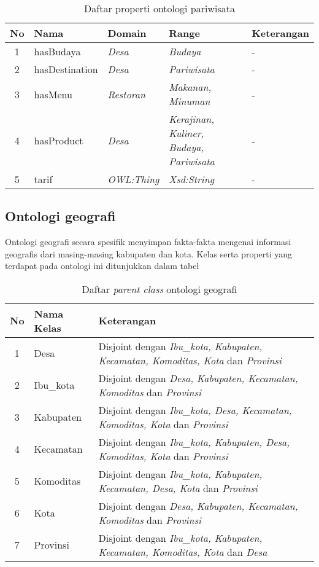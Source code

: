 \begin{table}[tb]
	\caption{Daftar properti ontologi pariwisata}
	\label{tab:ontopar_property}
	\centering

	\begin{tabularx}{\textwidth}{|c|l|l|X|X|}
	\hline

	\hline
	\textbf{No} & \textbf{Nama} & \textbf{Domain} & \textbf{Range} & \textbf{Keterangan} \\
	\hline
		1 & hasBudaya & \emph{Desa} & \emph{Budaya} & - \\
	\hline
		2 & hasDestination & \emph{Desa} & \emph{Pariwisata} & - \\
	\hline
		3 & hasMenu & \emph{Restoran} & \emph{Makanan, Minuman} & - \\
	\hline
		4 & hasProduct & \emph{Desa} & \emph{Kerajinan, Kuliner, Budaya, Pariwisata} & - \\
	\hline
		5 & tarif & \emph{OWL:Thing} & \emph{Xsd:String} & - \\
	\hline
	\end{tabularx}
\end{table}

\subsection{Ontologi geografi}
Ontologi geografi secara spesifik menyimpan fakta-fakta mengenai informasi geografis dari masing-masing kabupaten dan kota. Kelas serta properti yang terdapat pada ontologi ini ditunjukkan dalam tabel

\begin{table}[ht]
	\caption{Daftar \emph{parent class} ontologi geografi}
	\label{table:parent_class_ontogeo}
	\begin{tabularx}{\textwidth}{|c|l|X|}
		\hline
		\textbf{No} & \textbf{Nama Kelas} & \textbf{Keterangan} \\
		\hline
		1 & Desa & Disjoint dengan \emph{Ibu\_kota, Kabupaten, Kecamatan, Komoditas, Kota} dan \emph{Provinsi} \\
		\hline
		2 & Ibu\_kota & Disjoint dengan \emph{Desa, Kabupaten, Kecamatan, Komoditas} dan \emph{Provinsi} \\
		\hline
		3 & Kabupaten & Disjoint dengan \emph{Ibu\_kota, Desa, Kecamatan, Komoditas, Kota} dan \emph{Provinsi} \\
		\hline
		4 & Kecamatan & Disjoint dengan \emph{Ibu\_kota, Kabupaten, Desa, Komoditas, Kota} dan \emph{Provinsi} \\
		\hline
		5 & Komoditas & Disjoint dengan \emph{Ibu\_kota, Kabupaten, Kecamatan, Desa, Kota} dan \emph{Provinsi} \\
		\hline
		6 & Kota & Disjoint dengan \emph{Desa, Kabupaten, Kecamatan, Komoditas} dan \emph{Provinsi} \\
		\hline
		7 & Provinsi & Disjoint dengan \emph{Ibu\_kota, Kabupaten, Kecamatan, Komoditas, Kota} dan \emph{Desa} \\
		\hline
	\end{tabularx}
\end{table}


